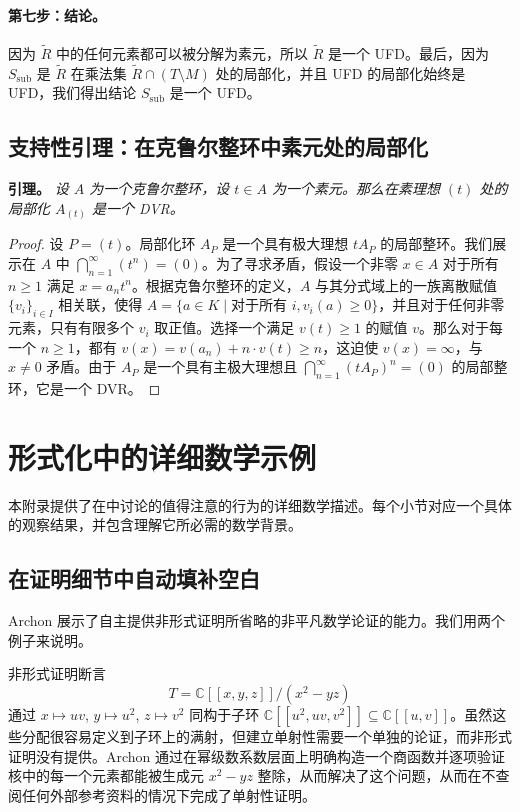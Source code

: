 ﻿\documentclass[]{pkuai4m}
\theoremstyle{plain}
\theoremstyle{definition}
\begin{document}
\paragraph{第七步：结论。} 因为 $\tilde{R}$ 中的任何元素都可以被分解为素元，所以 $\tilde{R}$ 是一个 UFD。最后，因为 $S_{\mathrm{sub}}$ 是 $\tilde{R}$ 在乘法集 $\tilde{R} \cap (T \setminus M)$ 处的局部化，并且 UFD 的局部化始终是 UFD，我们得出结论 $S_{\mathrm{sub}}$ 是一个 UFD。

\subsection*{支持性引理：在克鲁尔整环中素元处的局部化}

\noindent\textbf{引理。} \textit{设 $A$ 为一个克鲁尔整环，设 $t \in A$ 为一个素元。那么在素理想 $(t)$ 处的局部化 $A_{(t)}$ 是一个 DVR。}

\begin{proof}
设 $P = (t)$。局部化环 $A_P$ 是一个具有极大理想 $tA_P$ 的局部整环。我们展示在 $A$ 中 $\bigcap_{n=1}^{\infty} (t^n) = (0)$。为了寻求矛盾，假设一个非零 $x \in A$ 对于所有 $n \geq 1$ 满足 $x = a_n t^n$。根据克鲁尔整环的定义，$A$ 与其分式域上的一族离散赋值 $\{v_i\}_{i \in I}$ 相关联，使得 $A = \{a \in K \mid \text{对于所有 } i, v_i(a) \geq 0\}$，并且对于任何非零元素，只有有限多个 $v_i$ 取正值。选择一个满足 $v(t) \geq 1$ 的赋值 $v$。那么对于每一个 $n \geq 1$，都有 $v(x) = v(a_n) + n \cdot v(t) \geq n$，这迫使 $v(x) = \infty$，与 $x \neq 0$ 矛盾。由于 $A_P$ 是一个具有主极大理想且 $\bigcap_{n=1}^{\infty} (tA_P)^n = (0)$ 的局部整环，它是一个 DVR。
\end{proof}


\section{形式化中的详细数学示例}\label{appendix:detailed-examples}

本附录提供了在中讨论的值得注意的行为的详细数学描述。每个小节对应一个具体的观察结果，并包含理解它所必需的数学背景。

\subsection{在证明细节中自动填补空白}\label{subsubsec:gap-filling}

Archon 展示了自主提供非形式证明所省略的非平凡数学论证的能力。我们用两个例子来说明。

非形式证明断言
\[
T = \mathbb{C}[[x,y,z]]/(x^2 - yz)
\]
通过 $x \mapsto uv$, $y \mapsto u^2$, $z \mapsto v^2$ 同构于子环 $\mathbb{C}[[u^2, uv, v^2]] \subseteq \mathbb{C}[[u,v]]$。虽然这些分配很容易定义到子环上的满射，但建立单射性需要一个单独的论证，而非形式证明没有提供。Archon 通过在幂级数系数层面上明确构造一个商函数并逐项验证核中的每一个元素都能被生成元 $x^2 - yz$ 整除，从而解决了这个问题，从而在不查阅任何外部参考资料的情况下完成了单射性证明。
\end{document}
